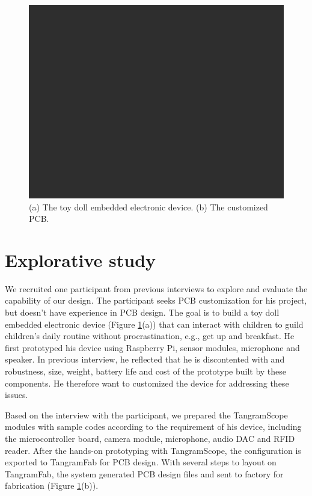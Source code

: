 \begin{figure}[tb]
  \centering
  \includegraphics[width=1\columnwidth]{image/tan/space1.png}
  \caption{(a) The toy doll embedded electronic device. (b) The customized PCB.}\label{fig:study}
\end{figure}

\section{Explorative study}
We recruited one participant from previous interviews to explore and evaluate the capability of our design.
The participant seeks PCB customization for his project, but doesn't have experience in PCB design.
The goal is to build a toy doll embedded electronic device (Figure \ref{fig:study}(a)) that can interact with children to guild children's daily routine without procrastination, e.g., get up and breakfast.
He first prototyped his device using Raspberry Pi, sensor modules, microphone and  speaker.
In previous interview, he reflected that he is discontented with and robustness, size, weight, battery life and cost of the prototype built by these components.
He therefore want to customized the device for addressing these issues.

Based on the interview with the participant, we prepared the TangramScope modules with sample codes according to the requirement of his device, including the microcontroller board, camera module, microphone, audio DAC and RFID reader.
After the hands-on prototyping with TangramScope, the configuration is exported to TangramFab for PCB design.
With several steps to layout on TangramFab, the system generated PCB design files and sent to factory for fabrication (Figure \ref{fig:study}(b)).

